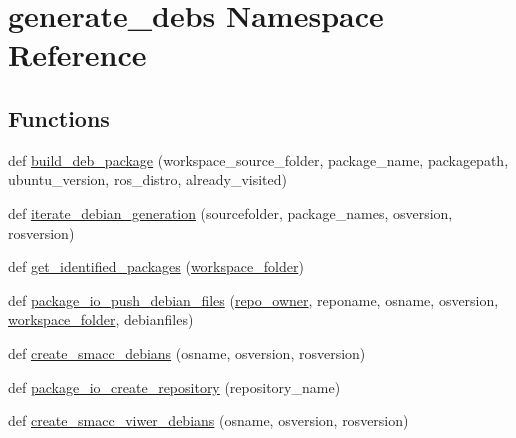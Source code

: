 \hypertarget{namespacegenerate__debs}{}\section{generate\+\_\+debs Namespace Reference}
\label{namespacegenerate__debs}
\subsection*{Functions}
\begin{DoxyCompactItemize}
\item 
def \hyperlink{namespacegenerate__debs_aa70c3f4917ddc57b13eaed8501f571a8}{build\+\_\+deb\+\_\+package} (workspace\+\_\+source\+\_\+folder, package\+\_\+name, packagepath, ubuntu\+\_\+version, ros\+\_\+distro, already\+\_\+visited)
\item 
def \hyperlink{namespacegenerate__debs_ad76fdfddc2dad3b2dc5b98239c6125d5}{iterate\+\_\+debian\+\_\+generation} (sourcefolder, package\+\_\+names, osversion, rosversion)
\item 
def \hyperlink{namespacegenerate__debs_aa91b87c6d9c3ed04015845cc9298431a}{get\+\_\+identified\+\_\+packages} (\hyperlink{namespacegenerate__debs_acb69863b90257249a30e43ebacfb8bd8}{workspace\+\_\+folder})
\item 
def \hyperlink{namespacegenerate__debs_acccc6dc6a3037e10949cfa377d1a7d18}{package\+\_\+io\+\_\+push\+\_\+debian\+\_\+files} (\hyperlink{namespacegenerate__debs_a23479dba5af50c90f3346b04d441ab2b}{repo\+\_\+owner}, reponame, osname, osversion, \hyperlink{namespacegenerate__debs_acb69863b90257249a30e43ebacfb8bd8}{workspace\+\_\+folder}, debianfiles)
\item 
def \hyperlink{namespacegenerate__debs_ad2e4e864bf753dbb1ed9a58436739905}{create\+\_\+smacc\+\_\+debians} (osname, osversion, rosversion)
\item 
def \hyperlink{namespacegenerate__debs_aabab609323683db61e505e355645ab4a}{package\+\_\+io\+\_\+create\+\_\+repository} (repository\+\_\+name)
\item 
def \hyperlink{namespacegenerate__debs_a1528f55b81a69cda3638628d37813bcf}{create\+\_\+smacc\+\_\+viwer\+\_\+debians} (osname, osversion, rosversion)
\end{DoxyCompactItemize}
